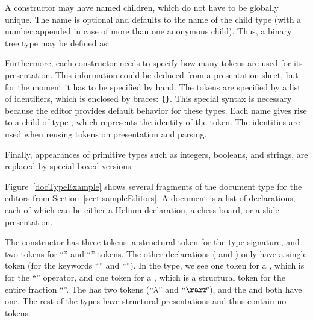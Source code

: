 A constructor may have named children, which do not have to be globally unique. The name is optional and defaults to the name of the child type (with a number appended in case of more than one anonymous child). Thus, a binary tree type may be defined as:


Furthermore, each constructor needs to specify how many tokens are used for its presentation. This information could be deduced from a presentation sheet, but for the moment it has to be specified by hand.  The tokens are specified by a list of identifiers, which is enclosed by braces: 
\verb|{|\verb|}|. This special syntax is necessary because the editor provides default behavior for these types.  Each name gives rise to a child of type , which represents the identity of the token. The identities are used when reusing tokens on presentation and parsing. 




\bc Finally, appearances of primitive types such as integers, booleans, and strings, are replaced by special boxed versions. 
\ec

Figure~\ref{docTypeExample} shows several fragments of the document type for the editors from Section~\ref{sect:sampleEditors}. A document is a list of declarations, each of which can be either a Helium declaration, a chess board, or a slide presentation.

The  constructor has three tokens: a structural token for the type signature, and two tokens for  ``\p{=}'' and ``\p{;}'' tokens. The other declarations ( and ) only have a single token (for the keywords ``'' and ``''). In the  type, we see one token for a , which is for the ``\p{+}'' operator, and one token for a , which is a structural token for the entire fraction ``''. The  has two tokens (``$\lambda$'' and ``$\rarr\!\!$''), and the  and  both have one.  The rest of the types have structural presentations and thus contain no tokens. 

